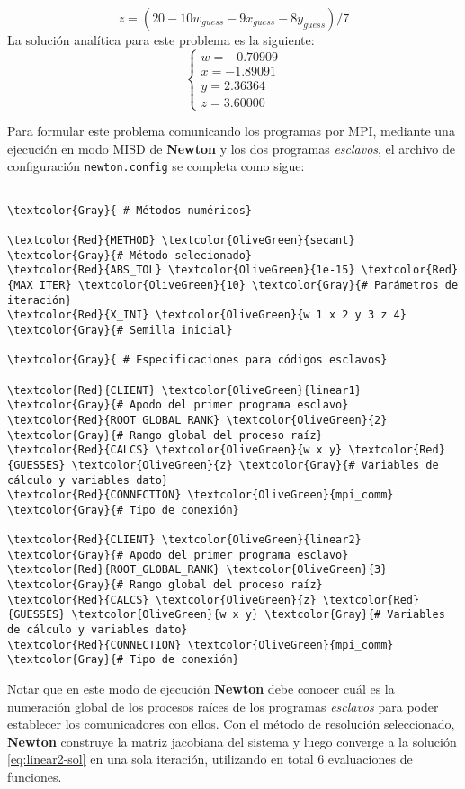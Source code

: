 \begin{equation}
 z = (20 - 10w_{guess} -  9x_{guess} - 8y_{guess})/ 7
 \label{eq:linear2b}
\end{equation}
La solución analítica para este problema es la siguiente:
\begin{equation}
\left\{\begin{matrix}
 w = -0.70909 \\
 x = -1.89091 \\
 y = 2.36364 \\
 z = 3.60000
\end{matrix}\right.
\label{eq:linear2-sol}
\end{equation}

Para formular este problema comunicando los programas por MPI,
mediante una ejecución en modo MISD de \textbf{Newton} y los dos programas \textit{esclavos},
el archivo de configuración \texttt{newton.config} se completa como sigue:

\begin{Verbatim}[frame=single,commandchars=\\\{\}, backgroundcolor=\color{yellow}]

\textcolor{Gray}{ # Métodos numéricos}

\textcolor{Red}{METHOD} \textcolor{OliveGreen}{secant} \textcolor{Gray}{# Método selecionado}
\textcolor{Red}{ABS_TOL} \textcolor{OliveGreen}{1e-15} \textcolor{Red}{MAX_ITER} \textcolor{OliveGreen}{10} \textcolor{Gray}{# Parámetros de iteración}
\textcolor{Red}{X_INI} \textcolor{OliveGreen}{w 1 x 2 y 3 z 4} \textcolor{Gray}{# Semilla inicial}

\textcolor{Gray}{ # Especificaciones para códigos esclavos}

\textcolor{Red}{CLIENT} \textcolor{OliveGreen}{linear1} \textcolor{Gray}{# Apodo del primer programa esclavo}
\textcolor{Red}{ROOT_GLOBAL_RANK} \textcolor{OliveGreen}{2} \textcolor{Gray}{# Rango global del proceso raíz}
\textcolor{Red}{CALCS} \textcolor{OliveGreen}{w x y} \textcolor{Red}{GUESSES} \textcolor{OliveGreen}{z} \textcolor{Gray}{# Variables de cálculo y variables dato}
\textcolor{Red}{CONNECTION} \textcolor{OliveGreen}{mpi_comm} \textcolor{Gray}{# Tipo de conexión}

\textcolor{Red}{CLIENT} \textcolor{OliveGreen}{linear2} \textcolor{Gray}{# Apodo del primer programa esclavo}
\textcolor{Red}{ROOT_GLOBAL_RANK} \textcolor{OliveGreen}{3}  \textcolor{Gray}{# Rango global del proceso raíz}
\textcolor{Red}{CALCS} \textcolor{OliveGreen}{z} \textcolor{Red}{GUESSES} \textcolor{OliveGreen}{w x y} \textcolor{Gray}{# Variables de cálculo y variables dato}
\textcolor{Red}{CONNECTION} \textcolor{OliveGreen}{mpi_comm} \textcolor{Gray}{# Tipo de conexión}

\end{Verbatim}

Notar que en este modo de ejecución \textbf{Newton} debe conocer 
cuál es la numeración global de los procesos raíces de los programas \textit{esclavos} para poder establecer los comunicadores con ellos.
Con el método de resolución seleccionado, \textbf{Newton} construye la matriz jacobiana del sistema y luego converge a la solución \ref{eq:linear2-sol} en una sola iteración,
utilizando en total  6 evaluaciones de funciones.
